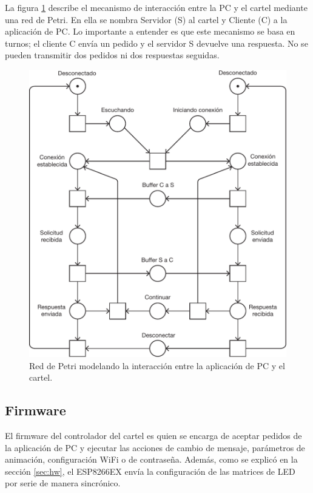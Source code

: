 La figura \ref{fig:petri-net} describe el mecanismo de interacción entre la PC y el cartel mediante una red de Petri. En ella se nombra Servidor (S) al cartel y Cliente (C) a la aplicación de PC. Lo importante a entender es que este mecanismo se basa en turnos; el cliente C envía un pedido y el servidor S devuelve una respuesta. No se pueden transmitir dos pedidos ni dos respuestas seguidas.

\begin{figure}[ht!]
	\centering
	\includegraphics[width=1\linewidth]{imagenes/petri-net.pdf}
	\caption{Red de Petri modelando la interacción entre la aplicación de PC y el cartel.}
	\label{fig:petri-net}
\end{figure}


\subsection{Firmware}
El firmware del controlador del cartel es quien se encarga de aceptar pedidos de la aplicación de PC y ejecutar las acciones de cambio de mensaje, parámetros de animación, configuración WiFi o de contraseña. Además, como se explicó en la sección \ref{sec:hw}, el ESP8266EX envía la configuración de las matrices de LED por serie de manera sincrónico.




